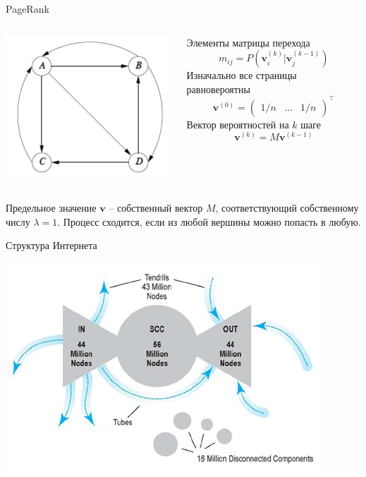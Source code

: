 \documentclass[10pt,a4paper]{beamer}
\begin{document}

\begin{frame}{PageRank}

\begin{columns}[C]
	\begin{column}{.5\textwidth}
    \includegraphics[scale=0.60]{images/pr1.png}
	\end{column}
    \begin{column}{.5\textwidth}
    Элементы матрицы перехода
	\[
	m_{ij} = P(\mathbf{v}_i^{(k)} | \mathbf{v}_j^{(k-1)})
	\]
	Изначально все страницы равновероятны
	\[
	\mathbf{v}^{(0)} = \begin{pmatrix}
	1/n & \ldots & 1/n
	\end{pmatrix}^\top
	\]
	Вектор вероятностей на $k$ шаге
	\[
	\mathbf{v}^{(k)} = M \mathbf{v}^{(k-1)}
	\]
    \end{column}
    
\end{columns}

\vspace{2em}
Предельное значение $\mathbf{v}$ -- собственный вектор $M$, соответствующий собственному числу $\lambda=1$. Процесс сходится, если из любой вершины можно попасть в любую.

\end{frame}


\begin{frame}{Структура Интернета}

\begin{center}
\includegraphics[scale=0.65]{images/internet.jpg}
\end{center}

\end{frame}
\end{document}
